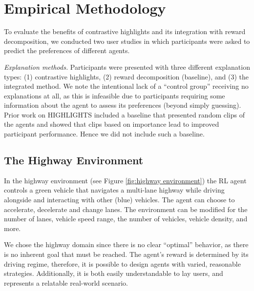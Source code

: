 \documentclass{ecai}
\begin{document}
\section{Empirical Methodology}
To evaluate the benefits of contrastive highlights and its integration with reward decomposition, we conducted two user studies in which participants were asked to predict the preferences of different agents.

\emph{Explanation methods.} 
Participants were presented with three different explanation types: (1) contrastive highlights, (2) reward decomposition (baseline), and (3) the integrated method. 
We note the intentional lack of a ``control group'' receiving no explanations at all, as this is infeasible due to participants requiring some information about the agent to assess its preferences (beyond simply guessing). Prior work on HIGHLIGHTS included a baseline that presented random clips of the agents \cite{amir2018highlights,huber2021local} and showed that clips based on importance lead to improved participant performance. Hence we did not include such a baseline. 


\subsection{The Highway Environment}
\label{sec:Highway_env}
In the highway environment (see Figure \ref{fig:highway environment}) the RL agent controls a green vehicle that navigates a multi-lane highway while driving alongside and interacting with other (blue) vehicles. The agent can choose to accelerate, decelerate and change lanes. The environment can be modified for the number of lanes, vehicle speed range, the number of vehicles, vehicle density, and more.

We chose the highway domain since there is no clear “optimal” behavior, as there is no inherent goal that must be reached. The agent's reward is determined by its driving regime, therefore, it is possible to design agents with varied, reasonable strategies. Additionally, it is both easily understandable to lay users, and represents a relatable real-world scenario.
\end{document}
